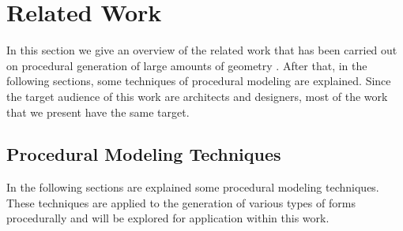 
% 
% 

\section{Related Work}
\label{sec:related_work}

In this section we give an overview of the related work that has been carried out on procedural generation of large amounts of geometry	. After that, in the following sections, some techniques of procedural modeling are explained.
Since the target audience of this work are architects and designers, most of the work that we present have the same target.








\subsection{Procedural Modeling Techniques} %
\label{sub:procedural_modeling_techniques}

In the following sections are explained some procedural modeling techniques. These techniques are applied to the generation of various types of forms procedurally and will be explored for application within this work.










%



%

%

%


